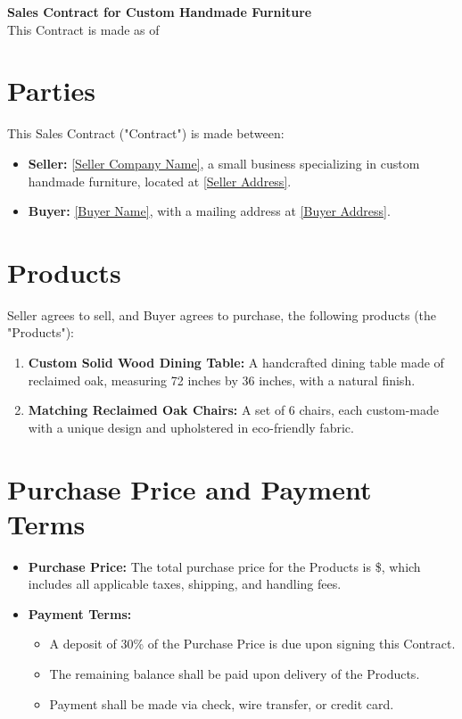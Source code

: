 \documentclass[12pt]{article}
\begin{document}
\begin{center}
    {\LARGE \textbf{Sales Contract for Custom Handmade Furniture}}\\[0.5cm]
    {\large This Contract is made as of \underline{\hspace{3cm}}}
\end{center}

\vspace{1cm}

\section{Parties}
This Sales Contract ("Contract") is made between:
\begin{itemize}
    \item \textbf{Seller:} \underline{[Seller Company Name]}, a small business specializing in custom handmade furniture, located at \underline{[Seller Address]}.
    \item \textbf{Buyer:} \underline{[Buyer Name]}, with a mailing address at \underline{[Buyer Address]}.
\end{itemize}

\section{Products}
Seller agrees to sell, and Buyer agrees to purchase, the following products (the "Products"):
\begin{enumerate}
    \item \textbf{Custom Solid Wood Dining Table:} A handcrafted dining table made of reclaimed oak, measuring 72 inches by 36 inches, with a natural finish.
    \item \textbf{Matching Reclaimed Oak Chairs:} A set of 6 chairs, each custom-made with a unique design and upholstered in eco-friendly fabric.
\end{enumerate}

\section{Purchase Price and Payment Terms}
\begin{itemize}
    \item \textbf{Purchase Price:} The total purchase price for the Products is \$\underline{\hspace{2cm}}, which includes all applicable taxes, shipping, and handling fees.
    \item \textbf{Payment Terms:} 
    \begin{itemize}
        \item A deposit of 30\% of the Purchase Price is due upon signing this Contract.
        \item The remaining balance shall be paid upon delivery of the Products.
        \item Payment shall be made via check, wire transfer, or credit card.
    \end{itemize}
\end{itemize}
\end{document}
